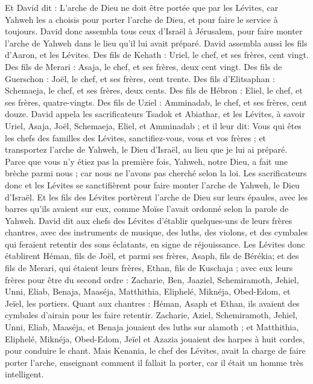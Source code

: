 \begin{multicols}{2}
Et David dit : L’arche de Dieu ne doit être portée que par les Lévites, car Yahweh les a choisis pour porter l’arche de Dieu, et pour faire le service à toujours.
David donc assembla tous ceux d'Israël à Jérusalem, pour faire monter l’arche de Yahweh dans le lieu qu'il lui avait préparé.
David assembla aussi les fils d'Aaron, et les Lévites.
Des fils de Kehath : Uriel, le chef, et ses frères, cent vingt.
Des fils de Merari : Asaja, le chef, et ses frères, deux cent vingt.
Des fils de Guerschon : Joël, le chef, et ses frères, cent trente.
Des fils d'Elitsaphan : Schemaeja, le chef, et ses frères, deux cents.
Des fils de Hébron : Eliel, le chef, et ses frères, quatre-vingts.
Des fils de Uziel : Amminadab, le chef, et ses frères, cent douze.
David appela les sacrificateurs Tsadok et Abiathar, et les Lévites, à savoir Uriel, Asaja, Joël, Schemaeja, Eliel, et Amminadab ;
et il leur dit: Vous qui êtes les chefs des familles des Lévites, sanctifiez-vous, vous et vos frères ; et transportez l’arche de Yahweh, le Dieu d'Israël, au lieu que je lui ai préparé.
Parce que vous n'y étiez pas la première fois, Yahweh, notre Dieu, a fait une brèche parmi nous ; car nous ne l'avons pas cherché selon la loi.
Les sacrificateurs donc et les Lévites se sanctifièrent pour faire monter l’arche de Yahweh, le Dieu d'Israël.
Et les fils des Lévites portèrent l’arche de Dieu sur leurs épaules, avec les barres qu'ils avaient sur eux, comme Moïse l'avait ordonné selon la parole de Yahweh.
David dit aux chefs des Lévites d'établir quelques-uns de leurs frères chantres, avec des instruments de musique, des luths, des violons, et des cymbales qui feraient retentir des sons éclatants, en signe de réjouissance.
Les Lévites donc établirent Héman, fils de Joël, et parmi ses frères, Asaph, fils de Bérékia; et des fils de Merari, qui étaient leurs frères, Ethan, fils de Kuschaja ;
avec eux leurs frères pour être du second ordre : Zacharie, Ben, Jaaziel, Schemiramoth, Jehiel, Unni, Eliab, Benaja, Maaséja, Matthithia, Eliphelé, Miknéja, Obed-Edom, et Jeïel, les portiers.
Quant aux chantres : Héman, Asaph et Ethan, ils avaient des cymbales d'airain pour les faire retentir.
Zacharie, Aziel, Schemiramoth, Jehiel, Unni, Eliab, Maaséja, et Benaja jouaient des luths sur alamoth ;
et Matthithia, Eliphelé, Miknéja, Obed-Edom, Jeïel et Azazia jouaient des harpes à huit cordes, pour conduire le chant.
Mais Kenania, le chef des Lévites, avait la charge de faire porter l’arche, enseignant comment il fallait la porter, car il était un homme très intelligent.

\end{multicols}
